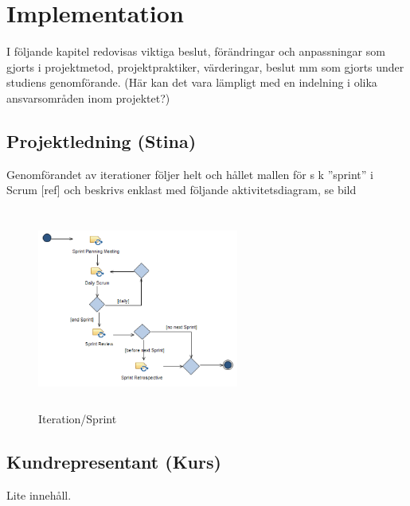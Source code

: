 
\section{Implementation}
I följande kapitel redovisas viktiga beslut, förändringar och anpassningar som gjorts 
i projektmetod, projektpraktiker, värderingar, beslut mm som gjorts under studiens genomförande.
(Här kan det vara lämpligt med en indelning i olika ansvarsområden inom projektet?)

\subsection{Projektledning (Stina)}
Genomförandet av iterationer följer helt och hållet mallen för s k ”sprint” i Scrum [ref] 
och beskrivs enklast med följande aktivitetsdiagram, se  bild
\begin{figure}[htbp]
    \centerline{\includegraphics[max height=250px, max width=250px]{Z. images/sprint.png}}
    \caption{Iteration/Sprint}
    \label{fig}
\end{figure}

\subsection{Kundrepresentant (Kurs)}
Lite innehåll.
